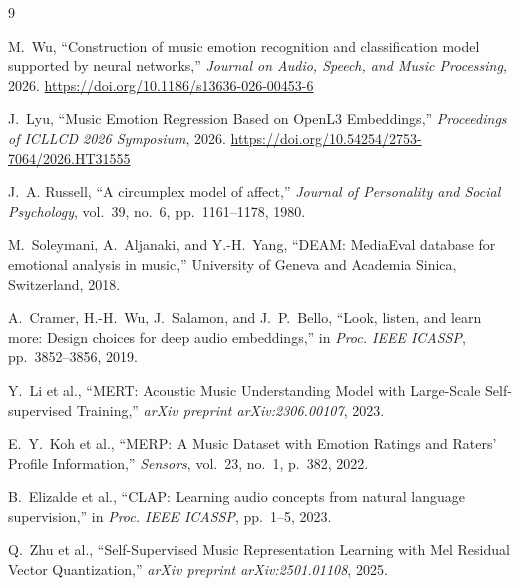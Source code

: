 \documentclass[12pt,a4paper]{article}
\begin{document}
\begin{thebibliography}{9}

M.~Wu, ``Construction of music emotion recognition and classification model supported by neural networks,'' \emph{Journal on Audio, Speech, and Music Processing}, 2026. \url{https://doi.org/10.1186/s13636-026-00453-6}

J.~Lyu, ``Music Emotion Regression Based on OpenL3 Embeddings,'' \emph{Proceedings of ICLLCD 2026 Symposium}, 2026. \url{https://doi.org/10.54254/2753-7064/2026.HT31555}

J.~A. Russell, ``A circumplex model of affect,'' \emph{Journal of Personality and Social Psychology}, vol.~39, no.~6, pp.~1161--1178, 1980.

M.~Soleymani, A.~Aljanaki, and Y.-H.~Yang, ``DEAM: MediaEval database for emotional analysis in music,'' University of Geneva and Academia Sinica, Switzerland, 2018.

A.~Cramer, H.-H.~Wu, J.~Salamon, and J.~P.~Bello, ``Look, listen, and learn more: Design choices for deep audio embeddings,'' in \emph{Proc. IEEE ICASSP}, pp.~3852--3856, 2019.

Y.~Li et al., ``MERT: Acoustic Music Understanding Model with Large-Scale Self-supervised Training,'' \emph{arXiv preprint arXiv:2306.00107}, 2023.

E.~Y.~Koh et al., ``MERP: A Music Dataset with Emotion Ratings and Raters' Profile Information,'' \emph{Sensors}, vol.~23, no.~1, p.~382, 2022.

B.~Elizalde et al., ``CLAP: Learning audio concepts from natural language supervision,'' in \emph{Proc. IEEE ICASSP}, pp.~1--5, 2023.

Q.~Zhu et al., ``Self-Supervised Music Representation Learning with Mel Residual Vector Quantization,'' \emph{arXiv preprint arXiv:2501.01108}, 2025.

\end{thebibliography}
\end{document}
